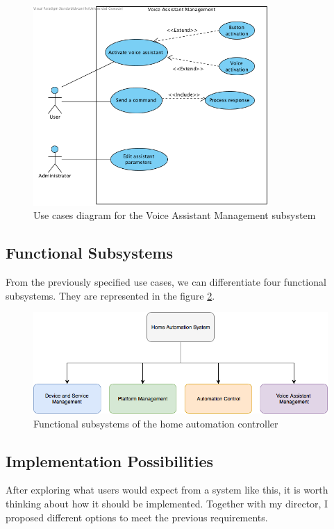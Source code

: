 \begin{figure}
	\centering
	\includegraphics[width=0.8\textwidth]{images/Chapter_06/UC-voice-assistant-management.png}
	\caption{Use cases diagram for the Voice Assistant Management subsystem}
	\label{fig:UC-voice-assistant-management}
\end{figure}

\subsection{Functional Subsystems}
From the previously specified use cases, we can differentiate four functional subsystems. They are represented in the figure
\ref{fig:functional-subsystems}.

\begin{figure}
	\centering
	\includegraphics[width=1\textwidth]{images/Chapter_06/functional-subsystems.png}
	\caption{Functional subsystems of the home automation controller}
	\label{fig:functional-subsystems}
\end{figure}

\subsection{Implementation Possibilities}
After exploring what users would expect from a system like this, it is worth thinking about how it should be implemented. Together
with my director, I proposed different options to meet the previous requirements.


